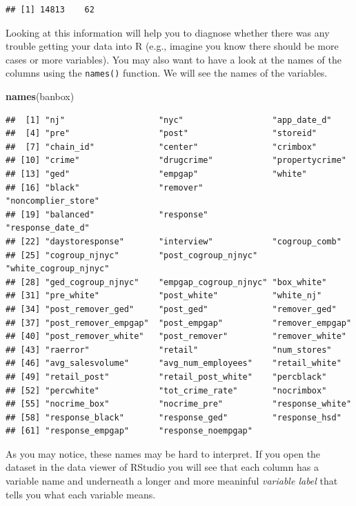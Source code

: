 \documentclass[]{book}
\newenvironment{Shaded}{\begin{snugshade}}{\end{snugshade}}
\newcommand{\KeywordTok}[1]{\textcolor[rgb]{0.13,0.29,0.53}{\textbf{#1}}}
\newcommand{\NormalTok}[1]{#1}
\theoremstyle{definition}
\theoremstyle{definition}
\theoremstyle{definition}
\theoremstyle{remark}
\begin{document}
\begin{verbatim}
## [1] 14813    62
\end{verbatim}

Looking at this information will help you to diagnose whether there was
any trouble getting your data into R (e.g., imagine you know there
should be more cases or more variables). You may also want to have a
look at the names of the columns using the \texttt{names()} function. We
will see the names of the variables.

\begin{Shaded}
\begin{Highlighting}[]
\KeywordTok{names}\NormalTok{(banbox)}
\end{Highlighting}
\end{Shaded}

\begin{verbatim}
##  [1] "nj"                   "nyc"                  "app_date_d"          
##  [4] "pre"                  "post"                 "storeid"             
##  [7] "chain_id"             "center"               "crimbox"             
## [10] "crime"                "drugcrime"            "propertycrime"       
## [13] "ged"                  "empgap"               "white"               
## [16] "black"                "remover"              "noncomplier_store"   
## [19] "balanced"             "response"             "response_date_d"     
## [22] "daystoresponse"       "interview"            "cogroup_comb"        
## [25] "cogroup_njnyc"        "post_cogroup_njnyc"   "white_cogroup_njnyc" 
## [28] "ged_cogroup_njnyc"    "empgap_cogroup_njnyc" "box_white"           
## [31] "pre_white"            "post_white"           "white_nj"            
## [34] "post_remover_ged"     "post_ged"             "remover_ged"         
## [37] "post_remover_empgap"  "post_empgap"          "remover_empgap"      
## [40] "post_remover_white"   "post_remover"         "remover_white"       
## [43] "raerror"              "retail"               "num_stores"          
## [46] "avg_salesvolume"      "avg_num_employees"    "retail_white"        
## [49] "retail_post"          "retail_post_white"    "percblack"           
## [52] "percwhite"            "tot_crime_rate"       "nocrimbox"           
## [55] "nocrime_box"          "nocrime_pre"          "response_white"      
## [58] "response_black"       "response_ged"         "response_hsd"        
## [61] "response_empgap"      "response_noempgap"
\end{verbatim}

As you may notice, these names may be hard to interpret. If you open the
dataset in the data viewer of RStudio you will see that each column has
a variable name and underneath a longer and more meaninful
\emph{variable label} that tells you what each variable means.
\end{document}
